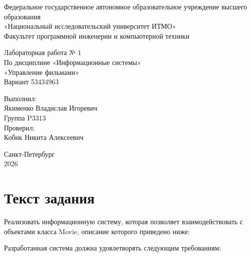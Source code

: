 \documentclass[12pt,a4paper]{article}
\begin{document}
\fontsize{13}{16}\selectfont
\begin{titlepage}
\thispagestyle{empty}
\begin{center}
{\fontsize{11}{13}\selectfont Федеральное государственное автономное образовательное учреждение высшего образования\\
«Национальный исследовательский университет ИТМО»\\[5pt]
Факультет программной инженерии и компьютерной техники}

\vspace{32mm}
Лабораторная работа № 1\\[5pt]
По дисциплине «Информационные системы»\\[5pt]
«Управление фильмами»\\[5pt]
Вариант 53434963
\end{center}

\vspace{36mm}
\hfill\begin{minipage}{0.55\linewidth}
Выполнил:\\
Якименко Владислав Игоревич\\
Группа P3313\\[12pt]
Проверил:\\
Кобик Никита Алексеевич
\end{minipage}

\vfill
\begin{center}Санкт-Петербург\\2026\end{center}
\end{titlepage}
\setcounter{page}{2}

\section*{Текст задания}

Реализовать информационную систему, которая позволяет взаимодействовать с объектами класса Movie, описание которого приведено ниже:





Разработанная система должна удовлетворять следующим требованиям:
\end{document}

